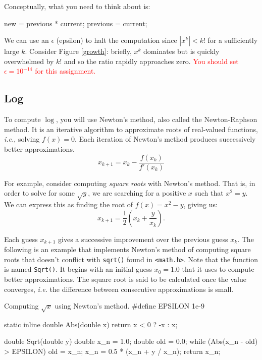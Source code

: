 \documentclass[11pt]{article}
\begin{document}
Conceptually, what you need to think about is:
\begin{codelisting}{}
  new = previous * current;
  previous = current;
\end{codelisting}

We can use an $\epsilon$ (epsilon) to halt the computation since
$|x^k| < k!$ for a sufficiently large $k$.  Consider Figure \ref{growth}:
briefly, $x^k$ dominates but is quickly overwhelmed by $k!$ and so
the ratio rapidly approaches zero.
\textcolor{red}{You should set $\epsilon = 10^{-14}$ for this assignment.} \\


\subsection{Log}

To compute $\log$, you will use Newton's method, also called the Newton-Raphson
method. It is an iterative algorithm to approximate roots of real-valued
functions, \textit{i.e.}\xspace, solving $f(x) = 0$. Each iteration of Newton's
method produces successively better approximations.
\[
  x_{k+1} = x_k - \frac{f(x_k)}{f'(x_k)}
\]

For example, consider computing \emph{square roots} with Newton's method. That
is, in order to solve for some $\sqrt{y}$, we are searching for a positive $x$
such that $x^2 = y$. We can express this as finding the root of $f(x) = x^2 -
y$, giving us:
\[
  x_{k+1} = \frac{1}{2}(x_k + \frac{y}{x_k}).
\]

Each guess $x_{k+1}$ gives a successive improvement over the previous guess
$x_k$. The following is an example that implements Newton's method of computing
square roots that doesn't conflict with \texttt{sqrt()} found in
\texttt{<math.h>}. Note that the function is named \texttt{Sqrt()}. It begins
with an initial guess $x_0 = 1.0$ that it uses to compute better approximations.
The square root is said to be calculated once the value converges,
\textit{i.e.}\xspace the difference between consecutive approximations is small.

\begin{codelisting}{Computing $\sqrt{x}$ using Newton's method.}
#define EPSILON 1e-9

static inline double Abs(double x) {
  return x < 0 ? -x : x;
}

double Sqrt(double y) {
  double x_n = 1.0;
  double old = 0.0;
  while (Abs(x_n - old) > EPSILON) {
    old = x_n;
    x_n = 0.5 * (x_n + y / x_n);
  }
  return x_n;
}
\end{codelisting}
\end{document}
